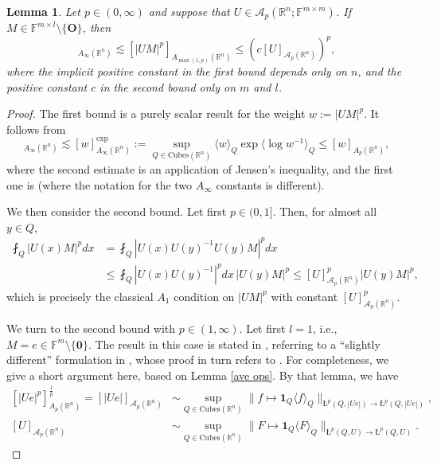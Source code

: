 \documentclass[11pt, reqno]{amsart}
\newtheorem{lemma}[theorem]{Lemma}
\theoremstyle{definition}
\theoremstyle{remark}
\numberwithin{equation}{section}
\newcommand{\A}{\mathscr A}
\newcommand{\F}{\mathbb F}
\newcommand{\R}{\mathbb R}
\newcommand{\one}{\mathbf{1}}
\newcommand{\ave}[1]{\langle #1\rangle}
\newcommand{\aveL}{\textit{\L}}
\newcommand{\abs}[1]{|#1|}
\newcommand{\Norm}[2]{\|#1\|_{#2}}
\newcommand{\Cubes}{\mathrm{Cubes}}
\begin{document}
\begin{lemma}\label{matrix 2 scalar}
Let $p\in(0,\infty)$ and suppose that $U\in\A_p(\R^n;\F^{m\times m})$. If
$M\in\F^{m\times l}\setminus\{\mathbf O\}$, then
\begin{equation*}
    [\abs{UM}^p]_{A_\infty(\R^n)}
   \lesssim[\abs{UM}^p]_{A_{\max(1,p)}(\R^n)}
   \leq (c[U]_{\A_p(\R^n)})^p,
\end{equation*}
where the implicit positive constant in the first bound depends only on $n$, and the positive constant $c$ in the second bound only on $m$ and $l$.
\end{lemma}

\begin{proof}
The first bound is a purely scalar result for the weight $w:=\abs{UM}^p$. It follows from
\begin{equation*}
  [w]_{A_\infty(\R^n)}\lesssim[w]_{A_\infty(\R^n)}^{\exp}:=
  \sup_{Q\in\Cubes(\R^n)}\ave{w}_Q\exp\ave{\log w^{-1}}_Q\leq[w]_{A_p(\R^n)},
\end{equation*}
where the second estimate is an application of Jensen's inequality, and the first one is \cite[Proposition 2.2]{HP13} (where the notation for the two $A_\infty$ constants is different).

We then consider the second bound. Let first $p\in(0,1]$. Then, for almost all $y\in Q$,
\begin{align*}
\fint_Q\abs{U(x)M}^p dx
&=\fint_Q\abs{U(x)U(y)^{-1}U(y)M}^p dx \\
&\leq\fint_Q\abs{U(x)U(y)^{-1}}^p dx\, \abs{U(y) M}^p
\leq [U]_{\A_p(\R^n)}^p \abs{U(y)M}^p,
\end{align*}
which is precisely the classical $A_1$ condition on $\abs{UM}^p$ with constant $[U]_{\A_p(\R^n)}^p$.

We turn to the second bound with $p\in(1,\infty)$.
Let first $l=1$, i.e., $M=e\in\F^m\setminus\{\mathbf 0\}$.
The result in this case is stated in \cite[Lemma 3.2(2)]{DKPS}, referring to a ``slightly different'' formulation in \cite[Lemma 2.2]{IKP}, whose proof in turn refers to \cite{NT96,Vol97}. For completeness, we give a short argument here, based on Lemma \ref{ave ops}. By that lemma, we have
\begin{equation}\label{from ave ops}
\begin{split}
    [\abs{Ue}^p]_{A_p(\R^n)}^{\frac1p}
    = [\abs{Ue}]_{\A_p(\R^n)}
    &\sim \sup_{Q\in\Cubes(\R^n)}
    \Norm{f\mapsto\one_Q\ave{f}_Q}{\aveL^p(Q,\abs{Ue})\to \aveL^p(Q,\abs{Ue})}, \\
    [U]_{\A_p(\R^n)}
    &\sim \sup_{Q\in\Cubes(\R^n)}\Norm{F\mapsto\one_Q\ave{F}_Q}{\aveL^p(Q,U)\to \aveL^p(Q,U)}.
\end{split}
\end{equation}


\end{proof}
\end{document}
